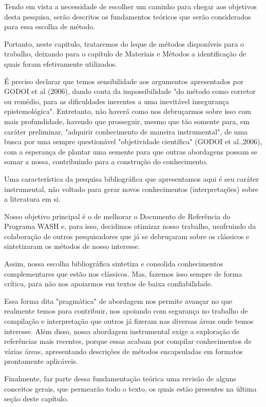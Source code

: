 Tendo em vista a necessidade de escolher um caminho para chegar  aos objetivos desta pesquisa, serão descritos os fundamentos teóricos que serão considerados para essa escolha de método.

Portanto, neste capítulo, trataremos do leque de métodos disponíveis para o trabalho, deixando para o capítulo de Materiais e Métodos a identificação de quais foram efetivamente utilizados.

É preciso declarar que temos sensibilidade aos argumentos apresentados por GODOI et al (2006), dando conta da impossibilidade "do método como corretor ou remédio, para as dificuldades inerentes a uma inevitável insegurança epistemológica". Entretanto, não haverá como nos debruçarmos sobre isso com mais profundidade, havendo que prosseguir, mesmo que tão somente para, em caráter preliminar, "adquirir conhecimento de maneira instrumental", de uma busca por uma sempre questionável "objetividade científica" (GODOI et al.,2006), com a esperança de plantar uma semente para que outras abordagens possam se somar a nossa, contribuindo para a construção do conhecimento.

Uma característica da pesquisa bibliográfica que apresentamos aqui é seu  caráter instrumental, não voltado para gerar novos conhecimentos (interpretações) sobre a literatura em si.

Nosso objetivo principal é o de melhorar o Documento de Referência do Programa WASH e, para isso, decidimos otimizar nosso trabalho, usufruindo da colaboração de outros pesquisadores que já se debruçaram sobre os clássicos e  sintetizaram os métodos de nosso interesse.

Assim, nossa escolha bibliográfica sintetiza e consolida conhecimentos complementares que estão nos clássicos. Mas, fazemos isso sempre de forma crítica, para não nos apoiarmos em textos de baixa confiabilidade.

Essa forma dita "pragmática" de abordagem nos permite avançar no que realmente temos para contribuir, nos apoiando com segurança no trabalho de compilação e interpretação que outros já fizeram nas diversas áreas onde temos interesse. Além disso, nossa abordagem instrumental exige a exploração de referências mais recentes, porque essas acabam por compilar conhecimentos de várias áreas, apresentando descrições de métodos encapsuladas em formatos prontamente aplicáveis.

Finalmente, faz parte dessa fundamentação teórica uma revisão de alguns conceitos gerais, que permearão todo o texto, os quais estão presentes na última seção deste capítulo.

